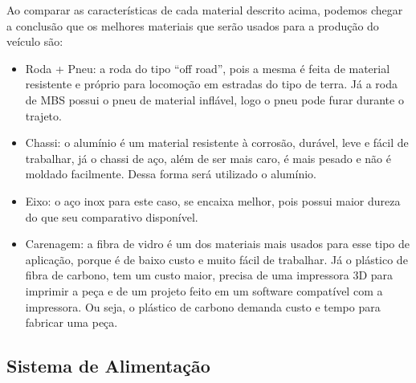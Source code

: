     \newpage

  Ao comparar as características de cada material descrito acima, podemos chegar a conclusão que os melhores materiais que
  serão usados para a produção do veículo são:

  \begin{itemize}
    \item Roda + Pneu: a roda do tipo “off road”, pois a mesma é feita de material resistente e próprio para locomoção em estradas do tipo de terra. Já a roda de MBS possui o pneu de material inflável, logo o pneu pode furar durante o trajeto.
    \item Chassi: o alumínio é um material resistente à corrosão, durável, leve e fácil de trabalhar, já o chassi de aço, além de ser mais caro, é mais pesado e não é moldado facilmente. Dessa forma será utilizado o alumínio.
    \item Eixo: o aço inox para este caso, se encaixa melhor, pois possui maior dureza do que seu comparativo disponível.
    \item Carenagem: a fibra de vidro é um dos materiais mais usados para esse tipo de aplicação, porque é de baixo custo e muito fácil de trabalhar. Já o plástico de fibra de carbono, tem um custo maior, precisa de uma impressora 3D para imprimir a peça e de um projeto feito em um software compatível com a  impressora. Ou seja, o plástico de carbono demanda custo e tempo para fabricar uma peça.
  \end{itemize}


  \subsection{Sistema de Alimentação}

